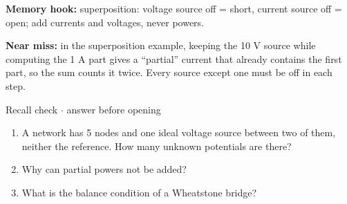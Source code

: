\documentclass[11pt]{article}
\begin{document}
\begin{keepsection}
\begin{keepsection}
\begin{notebox}\textbf{Memory hook:} superposition: voltage source off = short, current source off = open; add currents and voltages, never powers.\end{notebox}

\begin{notebox}\textbf{Near miss:} in the superposition example, keeping the 10 V source while computing the 1 A part gives a “partial” current that already contains the first part, so the sum counts it twice. Every source except one must be off in each step.\end{notebox}

\begin{recallbox}{Recall check \ensuremath{\cdot} answer before opening}
\begin{enumerate}
\item A network has 5 nodes and one ideal voltage source between two of them, neither the reference. How many unknown potentials are there?
\item Why can partial powers not be added?
\item What is the balance condition of a Wheatstone bridge?
\end{enumerate}

\end{recallbox}
\end{keepsection}
\end{keepsection}
\end{document}
